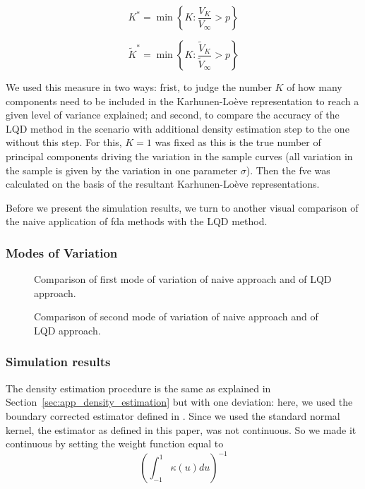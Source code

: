 \begin{equation}
    K^* = \min \left\{ K : \frac{V_K}{V_\infty} > p \right\}
    \label{eq:K_star}
\end{equation}

\begin{equation}
    \tilde{K}^* = \min \left\{ K : \frac{\tilde{V}_K}{\tilde{V}_\infty} > p \right\}
    \label{eq:tilde_K_star}
\end{equation}


We used this measure in two ways: frist, to judge the number $K$ of how many components need to
be included in the Karhunen-Loève representation to reach a given level of variance explained;
and second, to compare the accuracy of the LQD method in the scenario with additional density estimation
step to the one without this step. For this, $K = 1$ was fixed as this is the true number
of principal components driving the variation in the sample curves (all variation in the sample is given
by the variation in one parameter $\sigma$). Then the fve was calculated on the basis
of the resultant Karhunen-Loève representations.

Before we present the simulation results, we turn to another visual comparison of
the naive application of fda methods with the LQD method.

\subsubsection{Modes of Variation}
\label{sec:mov_example}

\begin{figure}[h]
    \centering
    \resizebox{0.9\textwidth}{!}{}
    \caption[Comparison: first mode of variation]{Comparison of first mode of variation
    of naive approach and of LQD approach.}
    \label{fig:1st_modes}
\end{figure}

\begin{figure}[h]
    \centering
    \resizebox{0.9\textwidth}{!}{}
    \caption[Comparison: second mode of variation]{Comparison of second mode of variation
    of naive approach and of LQD approach.}
    \label{fig:2nd_modes}
\end{figure}

\subsubsection{Simulation results}
\label{sec:illustration_simulation}
The density estimation procedure is the same as explained in Section~\ref{sec:app_density_estimation}
but with one deviation: here, we used the boundary corrected estimator defined in
\textcite{PetersenMüller2016}. Since we used the standard normal kernel, the estimator
as defined in this paper, was not continuous. So we made it continuous by setting the
weight function equal to
\begin{equation*}
    \left( \int_{-1}^{1} \kappa(u) du \right)^{-1}
\end{equation*}

